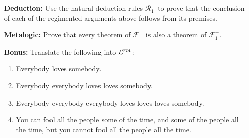 \documentclass[a4paper, 11pt]{article} %
\begin{document}
\begin{enumerate}[leftmargin=1.2in,labelsep=.15in]
\begin{enumerate}[label=(\arabic*)]
	\end{enumerate}
\item[\bf Deduction:] Use the natural deduction rules $\mathcal{R}_1^+$ to prove that the conclusion of each of the regimented arguments above follows from its premises.
\item[\bf Metalogic:] Prove that every theorem of $\mathcal{F}^+$ is also a theorem of $\mathcal{F}^+_1$.
\item[\bf Bonus:] Translate the following into $\mathcal{L}^{\textsc{fol}}$:
	\begin{enumerate}[label=(\arabic*)]\small
	\item Everybody loves somebody.
	\item Everybody everybody loves loves somebody.
	\item Everybody everybody everybody loves loves loves somebody.
	\item You can fool all the people some of the time, and some of the people all the time, but you cannot fool all the people all the time.
	\end{enumerate}
\end{enumerate}
\end{document}
